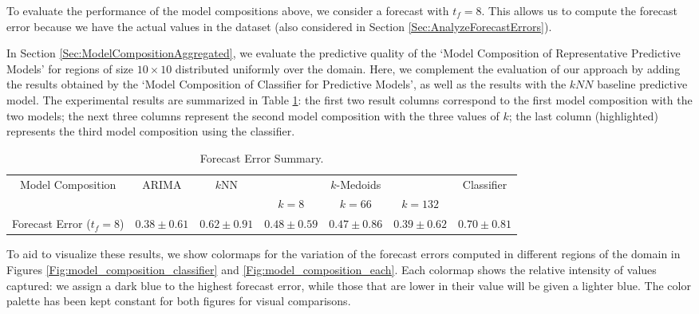 To evaluate the performance of the model compositions above, we consider a forecast with $t_{f} = 8$. This allows us to compute the forecast error because we have the actual values in the dataset (also considered in Section \ref{Sec:AnalyzeForecastErrors}). 

In Section \ref{Sec:ModelCompositionAggregated}, we evaluate the predictive quality of the `Model Composition of Representative Predictive Models' for regions of size $10 \times 10$ distributed uniformly over the domain. Here, we complement the evaluation of our approach by adding the results obtained by the `Model Composition of Classifier for Predictive Models', as well as the results with the $kNN$ baseline predictive model. The experimental results are summarized in Table \ref{Table:Query10x10_Classfier_Point_Each_StatSummary}: the first two result columns correspond to the first model composition with the two models; the next three columns represent the second model composition with the three values of $k$; the last column (highlighted) represents the third model composition using the classifier.

\begin{table}[h!]
	\centering
	\tiny
	\begin{tabular}{|c|c|c|c|c|c|c|}
	    \hline
        \multirow{2}{*}{Model Composition} & \multirow{2}{*}{ARIMA} & \multirow{2}{*}{$k$NN} & \multicolumn{3}{c|}{$k$-Medoids} & \multirow{2}{*}{Classifier}  \\
        \cline{4-6}
        & & & $k = 8$ & $k = 66$ & $k = 132$ &  \\
        \hline
        Forecast Error ($t_{f}=8$) & $0.38 \pm 0.61$ & $0.62 \pm 0.91$ & $0.48 \pm 0.59$ & $0.47 \pm 0.86$ & $0.39 \pm 0.62$ & \cellcolor{red!20}$0.70 \pm 0.81$ \\
        \hline
	\end{tabular}
	\caption{Forecast Error Summary.}
	\label{Table:Query10x10_Classfier_Point_Each_StatSummary}
\end{table}

To aid to visualize these results, we show colormaps for the variation of the forecast errors computed in different regions of the domain in Figures \ref{Fig:model_composition_classifier} and \ref{Fig:model_composition_each}. Each colormap shows the relative intensity of values captured: we assign a dark blue to the highest forecast error, while those that are lower in their value will be given a lighter blue. The color palette has been kept constant for both figures for visual comparisons.

